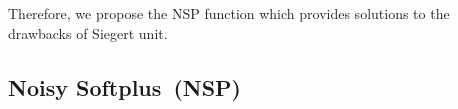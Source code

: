 	Therefore, we propose the NSP function which provides solutions to the drawbacks of Siegert unit.

		
	\subsection{Noisy Softplus~(NSP)}
	\label{sec:NSP}
